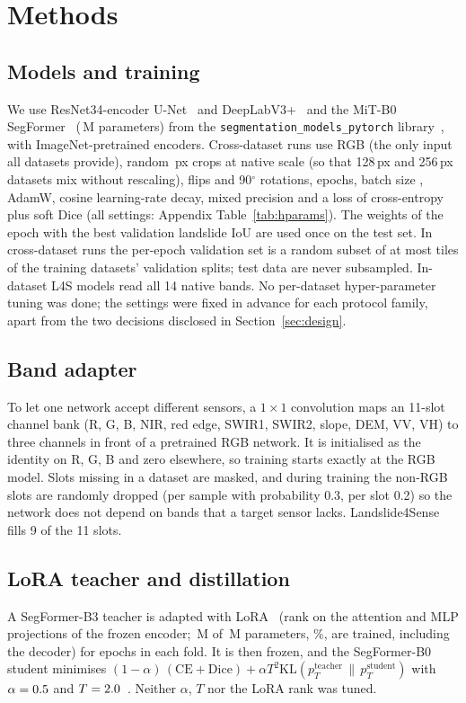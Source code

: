 \documentclass[11pt]{article}
\newcommand{\iou}{IoU}
\begin{document}
\section{Methods}
\subsection{Models and training}
We use ResNet34-encoder U-Net~\cite{ronneberger2015unet} and DeepLabV3+~\cite{chen2018deeplab} and the MiT-B0 SegFormer~\cite{xie2021segformer} (\SegParamsM{}\,M parameters) from the \texttt{segmentation\_models\_pytorch} library~\cite{iakubovskii2019smp}, with ImageNet-pretrained encoders. Cross-dataset runs use RGB (the only input all datasets provide), random \XdCrop\,px crops at native scale (so that 128\,px and 256\,px datasets mix without rescaling), flips and 90$^\circ$ rotations, \XdEpochs{} epochs, batch size \XdBatch{}, AdamW, cosine learning-rate decay, mixed precision and a loss of cross-entropy plus soft Dice (all settings: Appendix Table~\ref{tab:hparams}). The weights of the epoch with the best validation landslide \iou{} are used once on the test set. In cross-dataset runs the per-epoch validation set is a random subset of at most \XdMaxVal{} tiles of the training datasets' validation splits; test data are never subsampled. In-dataset L4S models read all 14 native bands. No per-dataset hyper-parameter tuning was done; the settings were fixed in advance for each protocol family, apart from the two decisions disclosed in Section~\ref{sec:design}.

\subsection{Band adapter}
To let one network accept different sensors, a $1\times1$ convolution maps an 11-slot channel bank (R, G, B, NIR, red edge, SWIR1, SWIR2, slope, DEM, VV, VH) to three channels in front of a pretrained RGB network. It is initialised as the identity on R, G, B and zero elsewhere, so training starts exactly at the RGB model. Slots missing in a dataset are masked, and during training the non-RGB slots are randomly dropped (per sample with probability 0.3, per slot 0.2) so the network does not depend on bands that a target sensor lacks. Landslide4Sense fills 9 of the 11 slots.

\subsection{LoRA teacher and distillation}
A SegFormer-B3 teacher is adapted with LoRA~\cite{hu2022lora} (rank \KdRank{} on the attention and MLP projections of the frozen encoder; \TeachTrainableM{}\,M of \TeachParamsM{}\,M parameters, \TeachTrainPct\%, are trained, including the decoder) for \KdTeacherEpochs{} epochs in each fold. It is then frozen, and the SegFormer-B0 student minimises $(1-\alpha)\,(\mathrm{CE}+\mathrm{Dice}) + \alpha T^2 \mathrm{KL}(p_T^{\mathrm{teacher}}\,\|\,p_T^{\mathrm{student}})$ with $\alpha=0.5{}$ and $T=2.0{}$~\cite{hinton2015distill}. Neither $\alpha$, $T$ nor the LoRA rank was tuned.
\end{document}
